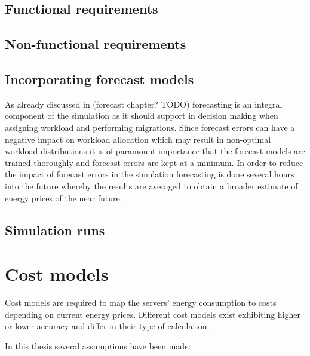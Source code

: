 \subsection{Functional requirements}

\subsection{Non-functional requirements}

\subsection{Incorporating forecast models}

As already discussed in (forecast chapter? TODO) forecasting is an integral component of the simulation as it should support in decision making when assigning workload and performing migrations. Since forecast errors can have a negative impact on workload allocation which may result in non-optimal workload distributions \cite{de2013study} it is of paramount importance that the forecast models are trained thoroughly and forecast errors are kept at a minimum. In order to reduce the impact of forecast errors in the simulation forecasting is done several hours into the future whereby the results are averaged to obtain a broader estimate of energy prices of the near future. 


\subsection{Simulation runs}



\section{Cost models}

Cost models are required to map the servers' energy consumption to costs depending on current energy prices. Different cost models exist exhibiting higher or lower accuracy and differ in their type of calculation. 

In this thesis several assumptions have been made: 

